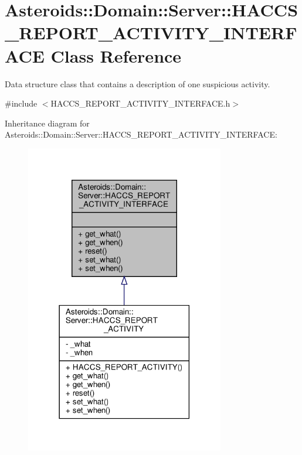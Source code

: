 \hypertarget{classAsteroids_1_1Domain_1_1Server_1_1HACCS__REPORT__ACTIVITY__INTERFACE}{}\section{Asteroids\+:\+:Domain\+:\+:Server\+:\+:H\+A\+C\+C\+S\+\_\+\+R\+E\+P\+O\+R\+T\+\_\+\+A\+C\+T\+I\+V\+I\+T\+Y\+\_\+\+I\+N\+T\+E\+R\+F\+A\+CE Class Reference}
\label{classAsteroids_1_1Domain_1_1Server_1_1HACCS__REPORT__ACTIVITY__INTERFACE}


Data structure class that contains a description of one suspicious activity.  




{\ttfamily \#include $<$H\+A\+C\+C\+S\+\_\+\+R\+E\+P\+O\+R\+T\+\_\+\+A\+C\+T\+I\+V\+I\+T\+Y\+\_\+\+I\+N\+T\+E\+R\+F\+A\+C\+E.\+h$>$}



Inheritance diagram for Asteroids\+:\+:Domain\+:\+:Server\+:\+:H\+A\+C\+C\+S\+\_\+\+R\+E\+P\+O\+R\+T\+\_\+\+A\+C\+T\+I\+V\+I\+T\+Y\+\_\+\+I\+N\+T\+E\+R\+F\+A\+CE\+:\nopagebreak
\begin{figure}[H]
\begin{center}
\leavevmode
\includegraphics[width=246pt]{classAsteroids_1_1Domain_1_1Server_1_1HACCS__REPORT__ACTIVITY__INTERFACE__inherit__graph}
\end{center}
\end{figure}


